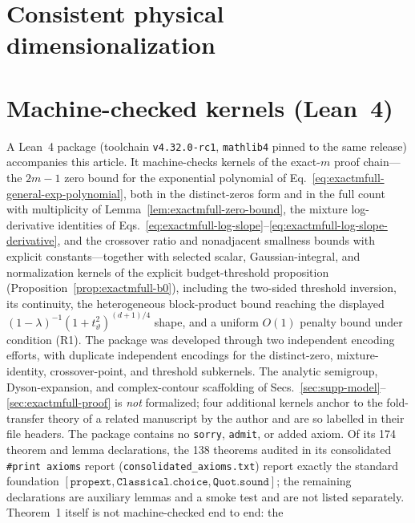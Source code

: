 \documentclass[aps,physrev,onecolumn,amsmath,amssymb,longbibliography]{revtex4-2}
\begin{document}
\FloatBarrier
\section{Consistent physical dimensionalization}
\label{sec:supp-physical-mapping}



\section{Machine-checked kernels (Lean~4)}
\label{sec:supp-lean}

A Lean~4 package (toolchain \texttt{v4.32.0-rc1}, \texttt{mathlib4} pinned to
the same release) accompanies this article. It machine-checks kernels of the
exact-\(m\) proof chain---the \(2m-1\) zero bound for the exponential
polynomial of Eq.~\eqref{eq:exactmfull-general-exp-polynomial}, both in the
distinct-zeros form and in the full count with multiplicity of
Lemma~\ref{lem:exactmfull-zero-bound}, the mixture log-derivative identities of
Eqs.~\eqref{eq:exactmfull-log-slope}--\eqref{eq:exactmfull-log-slope-derivative}, and the crossover ratio and nonadjacent
smallness bounds with explicit constants---together with selected scalar,
Gaussian-integral, and normalization kernels of the explicit
budget-threshold proposition (Proposition~\ref{prop:exactmfull-b0}), including the two-sided threshold
inversion, its continuity, the heterogeneous block-product bound reaching
the displayed \((1-\lambda)^{-1}(1+t_\vartheta^2)^{(d+1)/4}\) shape, and a
uniform \(O(1)\) penalty bound under condition (R1). The package was
developed through two independent encoding efforts, with duplicate
independent encodings for the distinct-zero, mixture-identity,
crossover-point, and threshold subkernels. The analytic semigroup,
Dyson-expansion, and complex-contour scaffolding of
Secs.~\ref{sec:supp-model}--\ref{sec:exactmfull-proof} is
\emph{not} formalized; four additional kernels anchor to the fold-transfer
theory of a related manuscript by the author \cite{zhouyi2026jcp}
and are so labelled in their file headers. The package contains no \texttt{sorry},
\texttt{admit}, or added axiom.  Of its 174 theorem and lemma declarations,
the 138 theorems audited in its consolidated \texttt{\#print axioms}
report (\texttt{consolidated\_axioms.txt}) report
exactly the standard foundation \([\texttt{propext},
\texttt{Classical.choice}, \texttt{Quot.sound}]\); the remaining
declarations are auxiliary lemmas and a smoke test and are not listed
separately.  Theorem~1 itself is not machine-checked end to end: the
\end{document}
